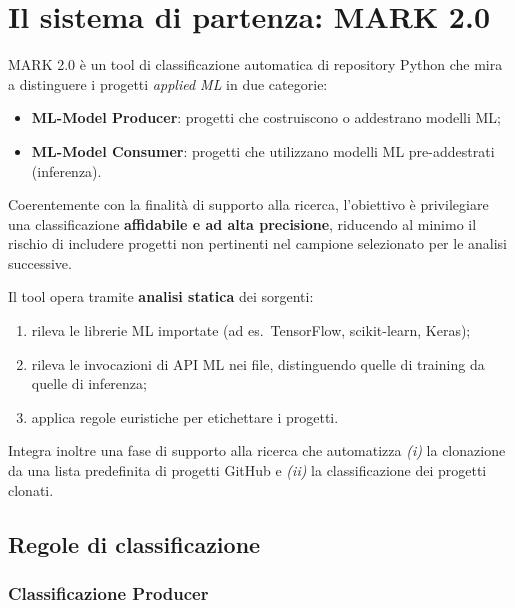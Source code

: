 \documentclass[11pt,a4paper]{article}
\newcommand{\baselineName}{MARK 2.0}
\begin{document}
\section{Il sistema di partenza: \baselineName{}}
\label{sec:baseline}

\baselineName{} \`e un tool di classificazione automatica di repository Python
che mira a distinguere i progetti \emph{applied ML} in due categorie:

\begin{itemize}[nosep]
  \item \textbf{ML-Model Producer}: progetti che costruiscono o addestrano
    modelli ML;
  \item \textbf{ML-Model Consumer}: progetti che utilizzano modelli ML
    pre-addestrati (inferenza).
\end{itemize}

Coerentemente con la finalit\`a di supporto alla ricerca, l'obiettivo \`e
privilegiare una classificazione \textbf{affidabile e ad alta precisione},
riducendo al minimo il rischio di includere progetti non pertinenti nel
campione selezionato per le analisi successive.

Il tool opera tramite \textbf{analisi statica} dei sorgenti:

\begin{enumerate}[nosep]
  \item rileva le librerie ML importate (ad es.\ TensorFlow, scikit-learn,
    Keras);
  \item rileva le invocazioni di API ML nei file, distinguendo quelle di
    training da quelle di inferenza;
  \item applica regole euristiche per etichettare i progetti.
\end{enumerate}

Integra inoltre una fase di supporto alla ricerca che automatizza \emph{(i)} la
clonazione da una lista predefinita di progetti GitHub e \emph{(ii)} la
classificazione dei progetti clonati.

\subsection{Regole di classificazione}
\label{sec:regole}

\subsubsection{Classificazione Producer}
\end{document}
